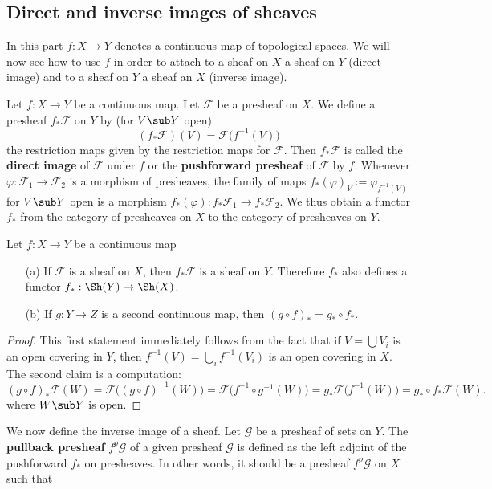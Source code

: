 \subsection{Direct and inverse images of sheaves}
In this part $f:X\to Y$ denotes a continuous map of topological spaces. We will now see how to use $f$ in order to attach to a sheaf on $X$ a sheaf on $Y$ (direct image) and to a sheaf on $Y$ a sheaf an $X$ (inverse image).
\begin{definition}
Let $f:X\to Y$ be a continuous map. Let $\mathscr{F}$ be a presheaf on $X$. We define a presheaf $f_*\mathscr{F}$ on $Y$ by (for $V\sub Y$ open)
\[(f_*\mathscr{F})(V)=\mathscr{F}\big(f^{-1}(V)\big)\]
the restriction maps given by the restriction maps for $\mathscr{F}$. Then $f_*\mathscr{F}$ is called the \textbf{direct image} of $\mathscr{F}$ under $f$ or the \textbf{pushforward presheaf} of $\mathscr{F}$ by $f$. Whenever $\varphi:\mathscr{F}_1\to\mathscr{F}_2$ is a morphism of presheaves, the family of maps $f_*(\varphi)_V:=\varphi_{f^{-1}(V)}$ for $V\sub Y$ open is a morphism $f_*(\varphi):f_*\mathscr{F}_1\to f_*\mathscr{F}_2$. We thus obtain a functor $f_*$ from the category of presheaves on $X$ to the category of presheaves on $Y$.
\end{definition}
\begin{proposition}\label{sheaf direct image prop}
Let $f:X\to Y$ be a continuous map
\begin{itemize}
\item[(a)] If $\mathscr{F}$ is a sheaf on $X$, then $f_*\mathscr{F}$ is a sheaf on $Y$. Therefore $f_*$ also defines a functor $f_*:\Sh(Y)\to\Sh(X)$.
\item[(b)] If $g:Y\to Z$ is a second continuous map, then $(g\circ f)_*=g_*\circ f_*$.
\end{itemize}
\end{proposition}
\begin{proof}
This first statement immediately follows from the fact that if $V=\bigcup V_i$ is an open covering in $Y$, then $f^{-1}(V)=\bigcup_if^{-1}(V_i)$ is an open covering in $X$. The second claim is a computation:
\[(g\circ f)_*\mathscr{F}(W)=\mathscr{F}\big((g\circ f)^{-1}(W)\big)=\mathscr{F}\big(f^{-1}\circ g^{-1}(W)\big)=g_*\mathscr{F}\big(f^{-1}(W)\big)=g_*\circ f_*\mathscr{F}(W).\]
where $W\sub Y$ is open.
\end{proof}
We now define the inverse image of a sheaf. Let $\mathscr{G}$ be a presheaf of sets on $Y$. The \textbf{pullback presheaf} $f^{p}\mathscr{G}$ of a given presheaf $\mathscr{G}$ is defined as the left adjoint of the pushforward $f_*$ on presheaves. In other words, it should be a presheaf $f^{p}\mathscr{G}$ on $X$ such that
